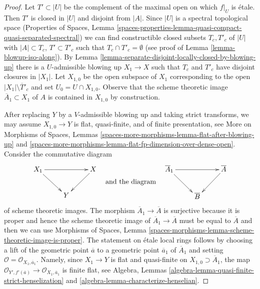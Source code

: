 \documentclass[10pt,a4paper]{amsart}
\theoremstyle{plain}
\theoremstyle{definition}
\theoremstyle{remark}
\numberwithin{equation}{subsection}
\begin{document}
\begin{proof}
Let $T' \subset |U|$ be the complement of the maximal open on which
$f|_U$ is \'etale. Then $T'$ is closed in $|U|$ and disjoint from $|A|$.
Since $|U|$ is a spectral topological space (Properties of Spaces, Lemma
\ref{spaces-properties-lemma-quasi-compact-quasi-separated-spectral})
we can find constructible closed subsets $T_c, T'_c$ of $|U|$
with $|A| \subset T_c$, $T' \subset T'_c$ such that
$T_c \cap T'_c = \emptyset$ (see proof of Lemma \ref{lemma-blowup-iso-along}).
By Lemma \ref{lemma-separate-disjoint-locally-closed-by-blowing-up}
there is a $U$-admissible blowing up $X_1 \to X$ such that
$T_c$ and $T'_c$ have disjoint closures in $|X_1|$.
Let $X_{1, 0}$ be the open subspace of $X_1$ corresponding to the open
$|X_1| \setminus \overline{T}'_c$ and set $U_0 = U \cap X_{1, 0}$.
Observe that the scheme theoretic image $\overline{A}_1 \subset X_1$
of $A$ is contained in $X_{1, 0}$ by construction.

\medskip\noindent
After replacing $Y$ by a $V$-admissible blowing up and taking
strict transforms, we may assume $X_{1, 0} \to Y$ is flat, quasi-finite,
and of finite presentation, see
More on Morphisms of Spaces, Lemmas
\ref{spaces-more-morphisms-lemma-flat-after-blowing-up} and
\ref{spaces-more-morphisms-lemma-flat-fp-dimension-over-dense-open}.
Consider the commutative diagram
$$
\vcenter{
\xymatrix{
X_1 \ar[rr] \ar[rd] & & X \ar[ld] \\
& Y
}
}
\quad\text{and the diagram}\quad
\vcenter{
\xymatrix{
\overline{A}_1 \ar[rr] \ar[rd] & & \overline{A} \ar[ld] \\
& \overline{B}
}
}
$$
of scheme theoretic images. The morphism $\overline{A}_1 \to \overline{A}$
is surjective because it is proper and hence the scheme theoretic
image of $\overline{A}_1 \to \overline{A}$ must be equal to $\overline{A}$
and then we can use Morphisms of Spaces, Lemma
\ref{spaces-morphisms-lemma-scheme-theoretic-image-is-proper}.
The statement on \'etale local rings follows
by choosing a lift of the geometric point $\overline{a}$
to a geometric point $\overline{a}_1$ of $\overline{A}_1$ and setting
$\mathcal{O} = \mathcal{O}_{X_1, \overline{a}_1}$. Namely, since
$X_1 \to Y$ is flat and quasi-finite on
$X_{1, 0} \supset \overline{A}_1$, the map
$\mathcal{O}_{Y', f'(\overline{a})} \to \mathcal{O}_{X_1, \overline{a}_1}$
is finite flat, see Algebra, Lemmas
\ref{algebra-lemma-quasi-finite-strict-henselization}
and \ref{algebra-lemma-characterize-henselian}.
\end{proof}
\end{document}
